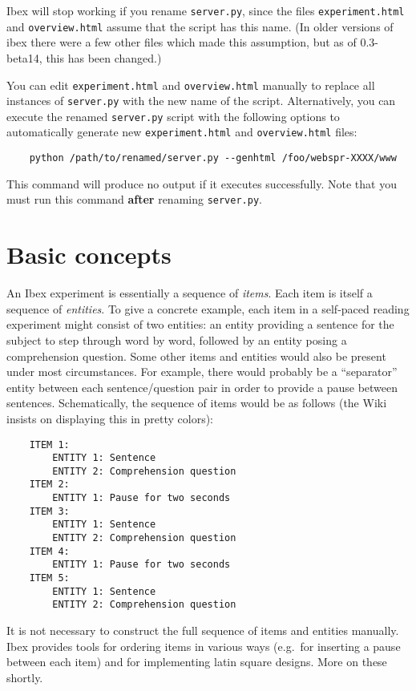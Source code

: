 \documentclass[]{article}
\begin{document}
Ibex will stop working if you rename \texttt{server.py}, since the files
\texttt{experiment.html} and \texttt{overview.html} assume that the
script has this name. (In older versions of ibex there were a few other
files which made this assumption, but as of 0.3-beta14, this has been
changed.)

You can edit \texttt{experiment.html} and \texttt{overview.html}
manually to replace all instances of \texttt{server.py} with the new
name of the script. Alternatively, you can execute the renamed
\texttt{server.py} script with the following options to automatically
generate new \texttt{experiment.html} and \texttt{overview.html} files:

\begin{verbatim}
    python /path/to/renamed/server.py --genhtml /foo/webspr-XXXX/www
\end{verbatim}

This command will produce no output if it executes successfully. Note
that you must run this command \textbf{after} renaming
\texttt{server.py}.

\section{Basic concepts}\label{basic-concepts}

An Ibex experiment is essentially a sequence of \emph{items}. Each item
is itself a sequence of \emph{entities}. To give a concrete example,
each item in a self-paced reading experiment might consist of two
entities: an entity providing a sentence for the subject to step through
word by word, followed by an entity posing a comprehension question.
Some other items and entities would also be present under most
circumstances. For example, there would probably be a ``separator''
entity between each sentence/question pair in order to provide a pause
between sentences. Schematically, the sequence of items would be as
follows (the Wiki insists on displaying this in pretty colors):

\begin{verbatim}
    ITEM 1:
        ENTITY 1: Sentence
        ENTITY 2: Comprehension question
    ITEM 2:
        ENTITY 1: Pause for two seconds
    ITEM 3:
        ENTITY 1: Sentence
        ENTITY 2: Comprehension question
    ITEM 4:
        ENTITY 1: Pause for two seconds
    ITEM 5:
        ENTITY 1: Sentence
        ENTITY 2: Comprehension question
\end{verbatim}

It is not necessary to construct the full sequence of items and entities
manually. Ibex provides tools for ordering items in various ways
(e.g.~for inserting a pause between each item) and for implementing
latin square designs. More on these shortly.
\end{document}
